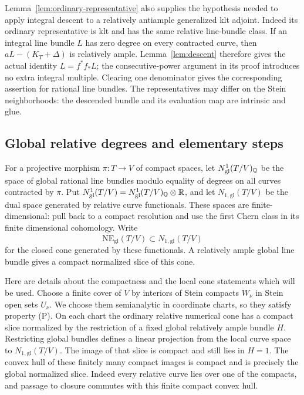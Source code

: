 Lemma~\ref{lem:ordinary-representative} also supplies the hypothesis
needed to apply integral descent to a relatively antiample generalized
klt adjoint.  Indeed its ordinary representative is klt and has the
same relative line-bundle class.  If an integral line bundle $L$ has
zero degree on every contracted curve, then
$aL-(K_T+\Delta)$ is relatively ample.  Lemma~\ref{lem:descent}
therefore gives the actual identity $L=f^*f_*L$; the consecutive-power
argument in its proof introduces no extra integral multiple.  Clearing
one denominator gives the corresponding assertion for rational line
bundles.  The representatives may differ on the Stein neighborhoods:
the descended bundle and its evaluation map are intrinsic and glue.

\subsection{Global relative degrees and elementary steps}

For a projective morphism $\pi\colon T\to V$ of compact spaces, let
$N^1_{\mathrm{gl}}(T/V)_{\mathbb Q}$ be the space of global rational line
bundles modulo equality of degrees on all curves contracted by $\pi$.
Put $N^1_{\mathrm{gl}}(T/V)=N^1_{\mathrm{gl}}(T/V)_{\mathbb Q}\otimes\mathbb R$,
and let $N_{1,\mathrm{gl}}(T/V)$ be the dual space generated by relative
curve functionals.  These spaces are finite-dimensional: pull back to
a compact resolution and use the first Chern class in its finite
dimensional cohomology.  Write
\[
 \overline{\mathrm{NE}}_{\mathrm{gl}}(T/V)
 \subset N_{1,\mathrm{gl}}(T/V)
\]
for the closed cone generated by these functionals.  A relatively ample
global line bundle gives a compact normalized slice of this cone.

Here are details about the compactness and the local cone statements
which will be used.  Choose a finite cover of $V$ by interiors of
Stein compacts $W_\nu$ in Stein open sets $U_\nu$.  We choose them
semianalytic in coordinate charts, so they satisfy property
\textup{(P)}.  On each chart the ordinary
relative numerical cone has a compact slice normalized by the
restriction of a fixed global relatively ample bundle $H$.  Restricting
global bundles defines a linear projection from the local curve space
to $N_{1,\mathrm{gl}}(T/V)$.  The image of that slice is compact and
still lies in $H=1$.  The convex hull of these finitely many compact
images is compact and is precisely the global normalized slice.
Indeed every relative curve lies over one of the compacts, and passage
to closure commutes with this finite compact convex hull.

